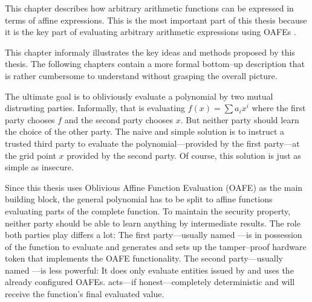\label{sec:methods}

This chapter describes how arbitrary arithmetic functions can be expressed in
terms of affine expressions. This is the most important part of this thesis
because it is the key part of evaluating arbitrary arithmetic expressions
using OAFEs \cite{davidgoliath}.


%
%
\label{sec:illustration}

This chapter informaly illustrates the key ideas and methods proposed by this
thesis. The following chapters contain a more formal bottom--up description that
is rather cumbersome to understand without grasping the overall picture.

The ultimate goal is to obliviously evaluate a polynomial by two mutual
distrusting parties. Informally, that is evaluating $f(x) = \sum a_ix^i$ where
the first party chooses $f$ and the second party chooses $x$. But neither
party should learn the choice of the other party. The naive and simple solution
is to instruct a trusted third party to evaluate the polynomial---provided by
the first party---at the grid point $x$ provided by the second party.
Of course, this solution is just as simple as insecure.

Since this thesis uses Oblivious Affine Function Evaluation (OAFE) as the main
building block, the general polynomial has to be split to affine functions
evaluating parts of the complete function. To maintain the security property,
neither party should be able to learn anything by intermediate results. The role
both parties play differs a lot: The first party---usually named \JWpOne{}---is
in possession of the function to evaluate and generates and sets up the
tamper--proof hardware token that implements the OAFE functionality. The second
party---usually named \JWpTwo{}---is less powerful: It does only evaluate
entities issued by \JWpOne{} and uses the already configured OAFEs. \JWpTwo{}
acts---if honest---completely deterministic and will receive the function's
final evaluated value.

